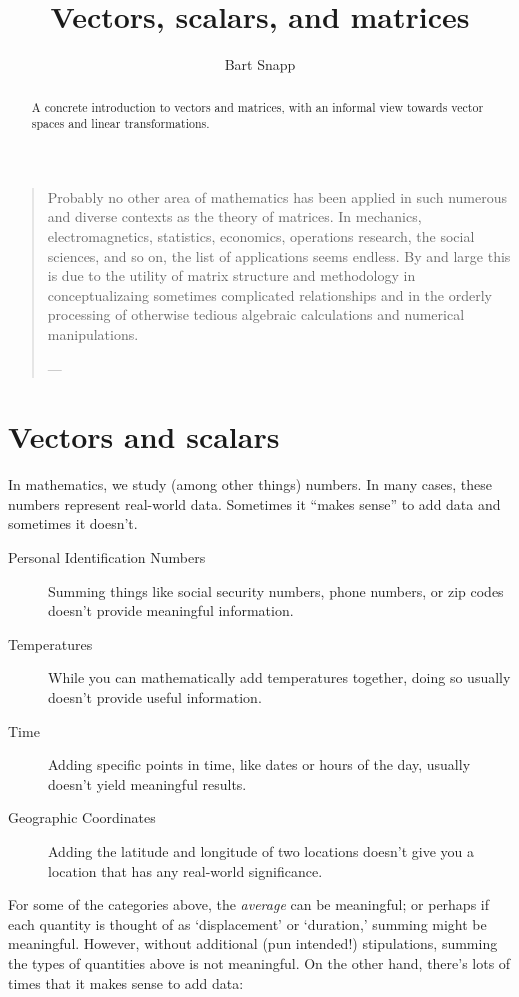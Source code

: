 \documentclass{ximera}
\author{Bart Snapp}
\title{Vectors, scalars, and matrices}
\begin{document}
\begin{abstract}
  A concrete introduction to vectors and matrices, with an informal
  view towards vector spaces and linear transformations.
\end{abstract}
\maketitle


\begin{quote}
  Probably no other area of mathematics has been applied in such
  numerous and diverse contexts as the theory of matrices. In
  mechanics, electromagnetics, statistics, economics, operations
  research, the social sciences, and so on, the list of applications
  seems endless. By and large this is due to the utility of matrix
  structure and methodology in conceptualizaing sometimes complicated
  relationships and in the orderly processing of otherwise tedious
  algebraic calculations and numerical manipulations.

  
  
  \hfill ---
\end{quote}


\section{Vectors and scalars}

In mathematics, we study (among other things) numbers. In many cases,
these numbers represent real-world data. Sometimes it ``makes sense''
to add data and sometimes it doesn't.
\begin{concept}
\begin{description}
\item[Personal Identification Numbers] Summing things like social
  security numbers, phone numbers, or zip codes doesn't provide
  meaningful information.
\item[Temperatures] While you can mathematically add temperatures
  together, doing so usually doesn't provide useful information.
\item[Time] Adding specific points in time, like dates or hours of the
  day, usually doesn't yield meaningful results.
\item[Geographic Coordinates] Adding the latitude and longitude of two
  locations doesn't give you a location that has any real-world
  significance.
\end{description}
\end{concept}
For some of the categories above, the \textit{average} can be
meaningful; or perhaps if each quantity is thought of as
`displacement' or `duration,' summing might be meaningful. However,
without additional (pun intended!) stipulations, summing the types of
quantities above is not meaningful. On the other hand, there's lots of
times that it makes sense to add data:
\end{document}
